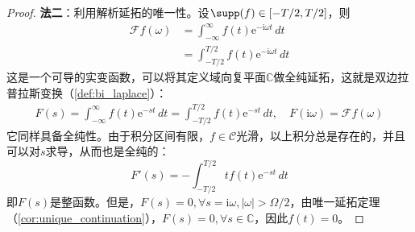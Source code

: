 \begin{proof}
    \textbf{法二}：利用解析延拓的唯一性。设$\supp(f)\in[-T/2,T/2]$，则\begin{align*}
        \mathcal{F} f(\omega) & =\int_{-\infty}^{\infty}f(t)\mathrm{e}^{-\mathrm{i}\omega t}\,dt \\
                              & =\int_{-T/2}^{T/2}f(t)\mathrm{e}^{-\mathrm{i}\omega t}\,dt
    \end{align*}
    这是一个可导的实变函数，可以将其定义域向复平面$\mathbb{C}$做全纯延拓，这就是双边拉普拉斯变换（\cref{def:bi_laplace}）：
    \begin{align*}
        F(s)=\int_{-\infty}^{\infty}f(t)\mathrm{e}^{-st}\,dt=\int_{-T/2}^{T/2}f(t)\mathrm{e}^{-st}\,dt,\quad F(\mathrm{i}\omega)=\mathcal{F} f(\omega)
    \end{align*}
    它同样具备全纯性。由于积分区间有限，$f\in\mathcal{C} $光滑，以上积分总是存在的，并且可以对$s$求导，从而也是全纯的：\[F'(s)=-\int_{-T/2}^{T/2}tf(t)\mathrm{e}^{-st}\,dt\]
    即$F(s)$是整函数。但是，$F(s)=0,\forall s=\mathrm{i}\omega,|\omega|> \Omega/2$，由唯一延拓定理（\cref{cor:unique_continuation}），$F(s)=0,\forall s\in\mathbb{C}$，因此$f(t)=0$。
\end{proof}

